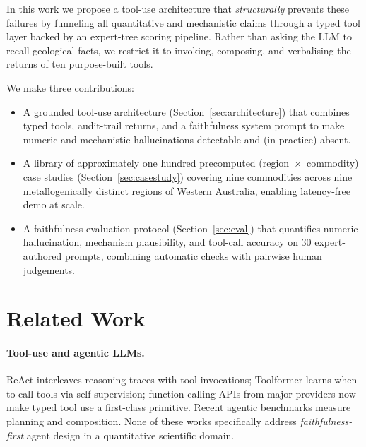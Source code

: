 \documentclass[11pt]{article}
\begin{document}
In this work we propose a tool-use architecture that
\emph{structurally} prevents these failures by funneling all
quantitative and mechanistic claims through a typed tool layer
backed by an expert-tree scoring pipeline. Rather than asking the LLM
to recall geological facts, we restrict it to invoking, composing, and
verbalising the returns of ten purpose-built tools.

We make three contributions:

\begin{itemize}
  \item A grounded tool-use architecture (Section~\ref{sec:architecture})
  that combines typed tools, audit-trail returns, and a faithfulness
  system prompt to make numeric and mechanistic hallucinations
  detectable and (in practice) absent.
  \item A library of approximately one hundred precomputed
  (region~$\times$~commodity) case studies
  (Section~\ref{sec:casestudy}) covering nine commodities across nine
  metallogenically distinct regions of Western Australia, enabling
  latency-free demo at scale.
  \item A faithfulness evaluation protocol (Section~\ref{sec:eval})
  that quantifies numeric hallucination, mechanism plausibility,
  and tool-call accuracy on 30 expert-authored prompts, combining
  automatic checks with pairwise human judgements.
\end{itemize}

\section{Related Work}
\label{sec:related}


\paragraph{Tool-use and agentic LLMs.}
ReAct \citep{yao2022react} interleaves reasoning traces with tool
invocations; Toolformer \citep{schick2023toolformer} learns when to
call tools via self-supervision; function-calling APIs from major
providers \citep{openai2023functioncalling} now make typed tool use a
first-class primitive. Recent agentic benchmarks
\citep{mialon2023gaia,liu2023agentbench} measure planning and
composition. None of these works specifically address
\emph{faithfulness-first} agent design in a quantitative scientific
domain.
\end{document}
